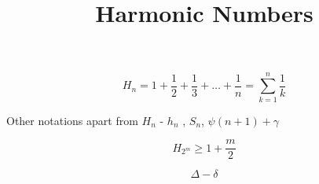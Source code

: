 \documentclass[12pt]{article}
\title{Harmonic Numbers}
\begin{document}
\maketitle

$$ H_n = 1 + \frac{1}{2} + \frac{1}{3} + \ldots + \frac{1}{n} = \sum_{k=1}^n{\frac{1}{k}}$$

Other notations apart from $H_n$ - $h_n$ , $S_n$, $\psi(n+1) + \gamma$

$$ H_{2^m} \ge 1 + \frac{m}{2} $$


$$ \Delta - \delta $$
\end{document}
